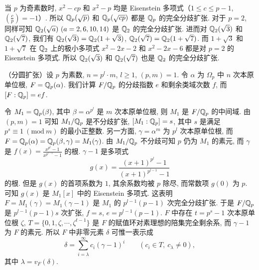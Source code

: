 \begin{example}
当 $p$ 为奇素数时, $x^2-cp$ 和 $x^2-p$ 均是 Eisenstein 多项式（$1\leqslant c\leqslant p-1$, $\left(\frac{c}{p}\right)=-1$）. 所以 $\mathbb{Q}_p(\sqrt{p})$ 和 $\mathbb{Q}_p(\sqrt{cp})$ 都是 $\mathbb{Q}_p$ 的完全分歧扩张. 对于 $p=2$, 同样可知 $\Q_2(\sqrt{a})\ (a=2,6,10,14)$ 是 $\mathbb{Q}_2$ 的完全分歧扩张. 进而对 $\mathbb{Q}_2(\sqrt{3})$ 和 $\mathbb{Q}_2(\sqrt{7})$, 我们有 $\mathbb{Q}_2(\sqrt{3})=\mathbb{Q}_2(1+\sqrt{3})$, $\mathbb{Q}_2(\sqrt{7})=\mathbb{Q}_2(1+\sqrt{7})$. 而 $1+\sqrt{3}$ 和 $1+\sqrt{7}$ 在 $\mathbb{Q}_2$ 上的极小多项式 $x^2-2x-2$ 和 $x^2-2x-6$ 都是对 $p=2$ 的 Eisenstein 多项式. 所以 $\mathbb{Q}_2(\sqrt{3})$ 和 $\mathbb{Q}_2(\sqrt{7})$ 也是 $\mathbb{Q}_2$ 的完全分歧扩张.
\end{example}

\begin{example}
（分圆扩张）设 $p$ 为素数, $n=p^l\cdot m$, $l\geqslant 1$, $(p,m)=1$. 令 $\alpha$ 为 $\Omega_p$ 中 $n$ 次本原单位根, $F=\mathbb{Q}_p(\alpha)$. 我们计算 $F/\mathbb{Q}_p$ 的分歧指数 $e$ 和剩余类域次数 $f$, 而 $[F:\mathbb{Q}_p]=ef$.

令 $M_1=\mathbb{Q}_p(\beta)$, 其中 $\beta=\alpha^{p^l}$ 是 $m$ 次本原单位根, 则 $M_1$ 是 $F/\mathbb{Q}_p$ 的中间域. 由 $(p,m)=1$ 可知 $M_1/\mathbb{Q}_p$ 是不分歧扩张, $[M_1:\mathbb{Q}_p]=s$, 其中 $s$ 是满足 $p^s\equiv 1\ (\mathrm{mod}\ m)$ 的最小正整数. 另一方面, $\gamma=\alpha^m$ 为 $p^l$ 次本原单位根, 而 $F=\mathbb{Q}_p(\alpha)=\mathbb{Q}_p(\beta,\gamma)=M_1(\gamma)$. 由 $M_1/\mathbb{Q}_p$ 不分歧可知 $p$ 仍为 $M_1$ 的素元, 而 $\gamma$ 是 $f(x)=\frac{x^{p^l}-1}{x^{p^{l-1}}-1}$ 的根. $\gamma-1$ 是多项式
\[
  g(x)=\frac{(x+1)^{p^l}-1}{(x+1)^{p^{l-1}}-1}
\]
的根. 但是 $g(x)$ 的首项系数为 $1$, 其余系数均被 $p$ 除尽, 而常数项 $g(0)$ 为 $p$. 可知 $g(x)$ 是 $M_1[x]$ 中的 Eisenstein 多项式. 这表明 $F=M_1(\gamma)=M_1(\gamma-1)$ 是 $M_1$ 的 $p^{l-1}(p-1)$ 次完全分歧扩张. 于是 $F/\mathbb{Q}_p$ 是 $p^{l-1}(p-1)s$ 次扩张, $f=s$, $e=p^{l-1}(p-1)$. $F$ 中存在 $t=p^s-1$ 次本原单位根 $\zeta$, $T=\{0,1,\zeta,\cdots,\zeta^{t-1}\}$ 是 $F$ 的赋值环对素理想的陪集完全剩余系, 而 $\gamma-1$ 为 $F$ 的素元. 所以 $F$ 中非零元素 $\delta$ 可惟一表示成
\[
  \delta=\sum_{i=\lambda}^{\infty}c_i(\gamma-1)^i\qquad(c_i\in T,\ c_{\lambda}\neq 0),
\]
其中 $\lambda=v_F(\delta)$.
\end{example}

